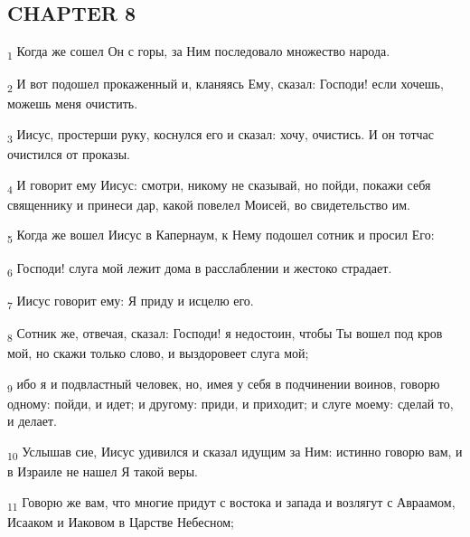 \subsection{CHAPTER 8}
\begin{tcolorbox}
\textsubscript{1} Когда же сошел Он с горы, за Ним последовало множество народа.
\end{tcolorbox}
\begin{tcolorbox}
\textsubscript{2} И вот подошел прокаженный и, кланяясь Ему, сказал: Господи! если хочешь, можешь меня очистить.
\end{tcolorbox}
\begin{tcolorbox}
\textsubscript{3} Иисус, простерши руку, коснулся его и сказал: хочу, очистись. И он тотчас очистился от проказы.
\end{tcolorbox}
\begin{tcolorbox}
\textsubscript{4} И говорит ему Иисус: смотри, никому не сказывай, но пойди, покажи себя священнику и принеси дар, какой повелел Моисей, во свидетельство им.
\end{tcolorbox}
\begin{tcolorbox}
\textsubscript{5} Когда же вошел Иисус в Капернаум, к Нему подошел сотник и просил Его:
\end{tcolorbox}
\begin{tcolorbox}
\textsubscript{6} Господи! слуга мой лежит дома в расслаблении и жестоко страдает.
\end{tcolorbox}
\begin{tcolorbox}
\textsubscript{7} Иисус говорит ему: Я приду и исцелю его.
\end{tcolorbox}
\begin{tcolorbox}
\textsubscript{8} Сотник же, отвечая, сказал: Господи! я недостоин, чтобы Ты вошел под кров мой, но скажи только слово, и выздоровеет слуга мой;
\end{tcolorbox}
\begin{tcolorbox}
\textsubscript{9} ибо я и подвластный человек, но, имея у себя в подчинении воинов, говорю одному: пойди, и идет; и другому: приди, и приходит; и слуге моему: сделай то, и делает.
\end{tcolorbox}
\begin{tcolorbox}
\textsubscript{10} Услышав сие, Иисус удивился и сказал идущим за Ним: истинно говорю вам, и в Израиле не нашел Я такой веры.
\end{tcolorbox}
\begin{tcolorbox}
\textsubscript{11} Говорю же вам, что многие придут с востока и запада и возлягут с Авраамом, Исааком и Иаковом в Царстве Небесном;
\end{tcolorbox}

